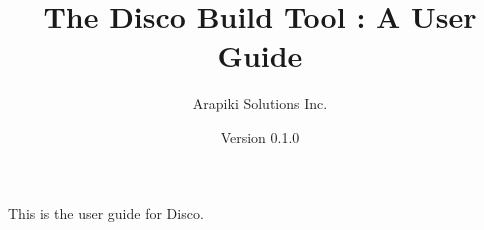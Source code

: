 \documentclass{article}
\title{The Disco Build Tool : A User Guide}
\author{Arapiki Solutions Inc.}
\date{Version 0.1.0}
\begin{document}
\maketitle

This is the user guide for Disco.
\end{document}
